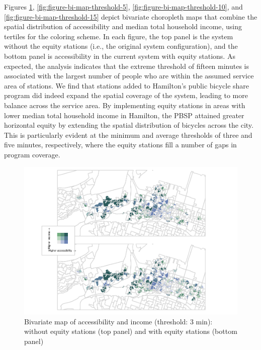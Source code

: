 \documentclass[]{elsarticle} %
\begin{document}
Figures \ref{fig:figure-bi-map-threshold-3},
\ref{fig:figure-bi-map-threshold-5},
\ref{fig:figure-bi-map-threshold-10}, and
\ref{fig:figure-bi-map-threshold-15} depict bivariate choropleth maps
that combine the spatial distribution of accessibility and median total
household income, using tertiles for the coloring scheme. In each
figure, the top panel is the system without the equity stations (i.e.,
the original system configuration), and the bottom panel is
accessibility in the current system with equity stations. As expected,
the analysis indicates that the extreme threshold of fifteen minutes is
associated with the largest number of people who are within the assumed
service area of stations. We find that stations added to Hamilton's
public bicycle share program did indeed expand the spatial coverage of
the system, leading to more balance across the service area. By
implementing equity stations in areas with lower median total household
income in Hamilton, the PBSP attained greater horizontal equity by
extending the spatial distribution of bicycles across the city. This is
particularly evident at the minimum and average thresholds of three and
five minutes, respectively, where the equity stations fill a number of
gaps in program coverage.

\begin{figure}
\includegraphics[width=1\linewidth]{Bike-share-spatial-equity_files/figure-latex/figure-bi-map-threshold-3-1} \caption{\label{fig-bivariate-map-threshold-3}Bivariate map of accessibility and income (threshold: 3 min): without equity stations (top panel) and with equity stations (bottom panel)}\label{fig:figure-bi-map-threshold-3}
\end{figure}
\end{document}

